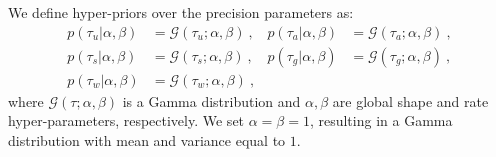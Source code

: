 We define hyper-priors over the precision parameters as:
\begin{align}
p( \tau_u | \alpha, \beta) & = \mathcal{G}(\tau_u ; \alpha, \beta ) \ , &
p( \tau_a | \alpha, \beta) & = \mathcal{G}(\tau_a ; \alpha, \beta ) \ , \nonumber \\
p( \tau_s | \alpha, \beta) & = \mathcal{G}(\tau_s ; \alpha, \beta ) \ , &  
p( \tau_g | \alpha, \beta) & = \mathcal{G}(\tau_g ; \alpha, \beta ) \ , \nonumber \\
p( \tau_w | \alpha, \beta) & = \mathcal{G}(\tau_w ; \alpha, \beta ) \ , 
\label{eq:hyper-params}
\end{align} 
where $\mathcal{G}(\tau ; \alpha, \beta)$ is a Gamma distribution and $\alpha, \beta$ are global shape and rate hyper-parameters, respectively.
We set $\alpha=\beta=1$, resulting in a Gamma distribution with mean and variance equal to $1$. 

